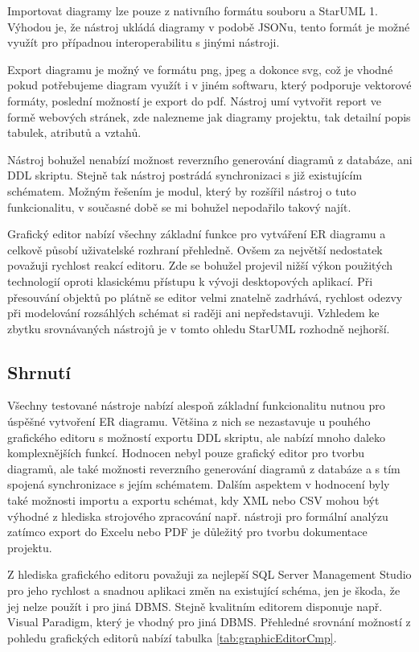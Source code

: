 \documentclass[czech,bachelor,public,dept460,male,oneside]{diploma}
\begin{document}
		Importovat diagramy lze pouze z nativního formátu souboru a StarUML 1. Výhodou je, že nástroj ukládá diagramy v podobě JSONu, tento formát je možné využít pro případnou interoperabilitu s jinými nástroji.
		
		Export diagramu je možný ve formátu png, jpeg a dokonce svg, což je vhodné pokud potřebujeme diagram využít i v jiném softwaru, který podporuje vektorové formáty, poslední možností je export do pdf. Nástroj umí vytvořit report ve formě webových stránek, zde nalezneme jak diagramy projektu, tak detailní popis tabulek, atributů a vztahů. 
		
		Nástroj bohužel nenabízí možnost reverzního generování diagramů z databáze, ani DDL skriptu. Stejně tak nástroj postrádá synchronizaci s již existujícím schématem. Možným řešením je modul, který by rozšířil nástroj o tuto funkcionalitu, v současné době se mi bohužel nepodařilo takový najít.
		
		Grafický editor nabízí všechny základní funkce pro vytváření ER diagramu a celkově působí uživatelské rozhraní přehledně. Ovšem za největší nedostatek považuji rychlost reakcí editoru. Zde se bohužel projevil nižší výkon použitých technologií oproti klasickému přístupu k vývoji desktopových aplikací. Při přesouvání objektů po plátně se editor velmi znatelně zadrhává, rychlost odezvy při modelování rozsáhlých schémat si raději ani nepředstavuji. Vzhledem ke zbytku srovnávaných nástrojů je v tomto ohledu StarUML rozhodně nejhorší.
	
	\subsection{Shrnutí} %
	Všechny testované nástroje nabízí alespoň základní funkcionalitu nutnou pro úspěšné vytvoření ER diagramu. Většina z nich se nezastavuje u pouhého grafického editoru s možností exportu DDL skriptu, ale nabízí mnoho daleko komplexnějších funkcí. Hodnocen nebyl pouze grafický editor pro tvorbu diagramů, ale také možnosti reverzního generování diagramů z databáze a s tím spojená synchronizace s jejím schématem. Dalším aspektem v hodnocení byly také možnosti importu a exportu schémat, kdy XML nebo CSV mohou být výhodné z hlediska strojového zpracování např. nástroji pro formální analýzu zatímco export do Excelu nebo PDF je důležitý pro tvorbu dokumentace projektu.
	
	Z hlediska grafického editoru považuji za nejlepší SQL Server Management Studio pro jeho rychlost a snadnou aplikaci změn na existující schéma, jen je škoda, že jej nelze použít i pro jiná DBMS. Stejně kvalitním editorem disponuje např. Visual Paradigm, který je vhodný pro jiná DBMS. Přehledné srovnání možností z pohledu grafických editorů nabízí tabulka \ref{tab:graphicEditorCmp}.
	
\end{document}
